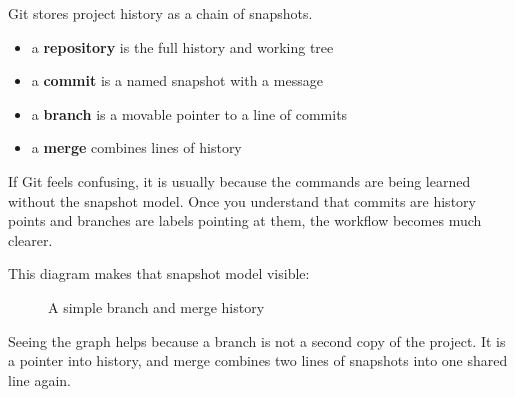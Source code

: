 \documentclass[12pt, a4paper, oneside]{book}
\begin{document}
Git stores project history as a chain of snapshots.
\begin{itemize}[leftmargin=2em]
    \item a \textbf{repository} is the full history and working tree
    \item a \textbf{commit} is a named snapshot with a message
    \item a \textbf{branch} is a movable pointer to a line of commits
    \item a \textbf{merge} combines lines of history
\end{itemize}

\begin{intuitionbox}
If Git feels confusing, it is usually because the commands are being learned without the snapshot model. Once you understand that commits are history points and branches are labels pointing at them, the workflow becomes much clearer.
\end{intuitionbox}

This diagram makes that snapshot model visible:

\begin{figure}[H]
\centering
{}
\caption{A simple branch and merge history}
\label{fig:git-branch-merge}
\end{figure}

Seeing the graph helps because a branch is not a second copy of the project. It is a pointer into history, and merge combines two lines of snapshots into one shared line again.
\end{document}
